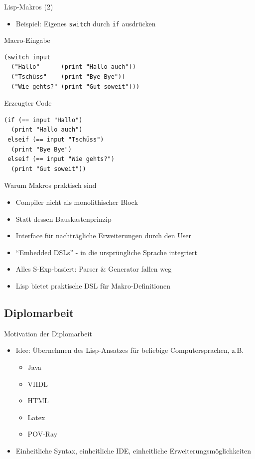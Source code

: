 \documentclass{beamer}
\newcommand{\pfeil}{\item[$\Rightarrow$]}
\begin{document}
\begin{frame}[t, fragile]{Lisp-Makros (2)}
  \begin{itemize}
  \item Beispiel: Eigenes \texttt{switch} durch \texttt{if} ausdrücken
  \end{itemize}
  \begin{block}{Macro-Eingabe}
\begin{verbatim}
(switch input
  ("Hallo"      (print "Hallo auch"))
  ("Tschüss"    (print "Bye Bye"))
  ("Wie gehts?" (print "Gut soweit")))
\end{verbatim}
  \end{block}
  \begin{block}{Erzeugter Code}
\begin{verbatim}
(if (== input "Hallo")
  (print "Hallo auch")
 elseif (== input "Tschüss") 
  (print "Bye Bye")
 elseif (== input "Wie gehts?")
  (print "Gut soweit"))
\end{verbatim}
  \end{block}
\end{frame}

\begin{frame}{Warum Makros praktisch sind}
  \begin{itemize}
  \item Compiler nicht als monolithischer Block
  \item Statt dessen Bauskastenprinzip
  \item Interface für nachträgliche Erweiterungen durch den User
  \item ``Embedded DSLs'' - in die ursprüngliche Sprache integriert
  \item Alles S-Exp-basiert: Parser \& Generator fallen weg
  \item Lisp bietet praktische DSL für Makro-Definitionen 
  \end{itemize}
\end{frame}

\subsection{Diplomarbeit}

\begin{frame}{Motivation der Diplomarbeit}
  \begin{itemize}
  \item Idee: Übernehmen des Lisp-Ansatzes für beliebige Computersprachen, z.B.
    \begin{itemize}
    \item Java
    \item VHDL
    \item HTML
    \item Latex
    \item POV-Ray
    \end{itemize}
  \pfeil Einheitliche Syntax, einheitliche IDE, einheitliche Erweiterungsmöglichkeiten
\end{itemize}
\end{frame}
\end{document}
